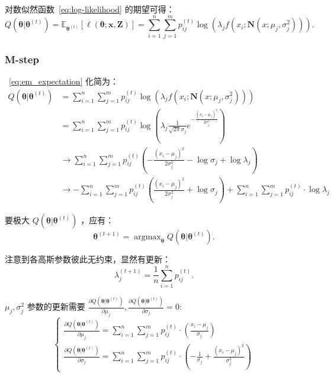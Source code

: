 对数似然函数~\eqref{eq:log-likelihood} 的期望可得：
\begin{equation}
    \label{eq:em_expectation}
    Q(\boldsymbol{\theta}|\boldsymbol{\theta}^{(t)})=
    \mathbb{E}_{\boldsymbol{\theta}^{(t)}}\left[\ell(\boldsymbol{\theta};
    \mathbf{x},\mathbf{Z})\right]=
    \sum_{i=1}^n\sum_{j=1}^mp_{ij}^{(t)}\log\left(\lambda_jf(x_i;\mathbf{N}(x;\mu_j, \sigma_j^2))\right).
\end{equation}

\subsubsection{M-step}\label{sec:m-step}
~\eqref{eq:em_expectation} 化简为：
\begin{equation}
    \begin{aligned}
        Q(\boldsymbol{\theta}|\boldsymbol{\theta}^{(t)})
        &=\sum_{i=1}^n\sum_{j=1}^mp_{ij}^{(t)}\log\left(\lambda_jf(x_i;\mathbf{N}
        (x;\mu_j, \sigma_j^2))\right)\\
        &=\sum_{i=1}^n\sum_{j=1}^mp_{ij}^{(t)}\log\left(
        \lambda_{j}\frac{1}{\sqrt{2\pi}\sigma_j}e^{-\frac{(x_i-\mu_{j})^2}{2\sigma_j^2}}\right)\\
        &\rightarrow\sum_{i=1}^n\sum_{j=1}^mp_{ij}^{(t)}\left(
        {-\frac{(x_i-\mu_{j})^2}{2\sigma_j^2}}-\log{\sigma_j}+\log{\lambda_j}\right)\\
        &\rightarrow-\sum_{i=1}^n\sum_{j=1}^mp_{ij}^{(t)}\left(
        {\frac{(x_i-\mu_{j})^2}{2\sigma_j^2}}+\log{\sigma_j}\right)
        +\sum_{i=1}^n\sum_{j=1}^mp_{ij}^{(t)}\cdot\log{\lambda_j}
    \end{aligned}
\end{equation}

要极大 $Q(\boldsymbol{\theta}|\boldsymbol{\theta}^{(t)})$ ，应有：
\begin{equation}
    \boldsymbol{\theta}^{(t+1)}=\operatorname{argmax}_{\boldsymbol{\theta}}Q(\boldsymbol{\theta}|\boldsymbol{\theta}^{(t)}).
\end{equation}

注意到各高斯参数彼此无约束，显然有更新：
\begin{equation}
    \label{eq:update-lambda}
    \lambda_j^{(t+1)}=\frac1n\sum_{i=1}^np_{ij}^{(t)}.
\end{equation}

$\mu_j,\sigma_j^2$ 参数的更新需要
$\frac{\partial Q(\boldsymbol{\theta}|\boldsymbol{\theta}^{(t)})}{\partial \mu_j}, 
\frac{\partial Q(\boldsymbol{\theta}|\boldsymbol{\theta}^{(t)})}{\partial \sigma_j} = 0$:
\begin{equation}
    \label{eq:freeq}
    \begin{cases}
        \frac{\partial Q(\boldsymbol{\theta}|\boldsymbol{\theta}^{(t)})}{\partial \mu_j}
        =\sum_{i=1}^n\sum_{j=1}^mp_{ij}^{(t)}\cdot\left(\frac{x_i-\mu_j}{\sigma_j}\right) \\
        \frac{\partial Q(\boldsymbol{\theta}|\boldsymbol{\theta}^{(t)})}{\partial \sigma_j}
        =\sum_{i=1}^n\sum_{j=1}^mp_{ij}^{(t)}\cdot\left(-\frac{1}{\sigma_j}+
        \frac{(x_i-\mu_j)^2}{\sigma_j^3}\right)
    \end{cases}
\end{equation}


